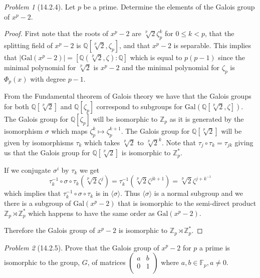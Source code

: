 \documentclass[10pt]{article}
\newcommand{\sk}{\vskip 10mm}
\newcommand{\bb}[1]{\mathbb{#1}}
\theoremstyle{remark}
\newtheorem{problem}{Problem}
\theoremstyle{remark}
\begin{document}
\sk

\begin{problem}[14.2.4]
  Let $p$ be a prime. Determine the elements of the Galois group of $x^p-2$.
\end{problem}

\begin{proof}
  First note that the roots of $x^p-2$ are $\sqrt[p]{2}\zeta_p^k$ for $0\leq k<p$,
  that the splitting field of $x^p-2$ is $\bb{Q}[\sqrt[p]{2},\zeta_p]$, and
  that $x^p-2$ is separable. This implies that
  $|\mathrm{Gal}(x^p-2)|=[\bb{Q}(\sqrt[p]{2},\zeta):\bb{Q}]$ which is equal to
  $p(p-1)$ since the minimal polynomial for $\sqrt[p]{2}$ is $x^p-2$ and
  the minimal polynomial for $\zeta_p$ is $\Phi_p(x)$ with degree $p-1$.

  From the Fundamental theorem of Galois theory we have that
  the Galois groups for both $\bb{Q}[\sqrt[p]{2}]$ and $\bb{Q}[\zeta_p]$ correspond
  to subgroups for $\mathrm{Gal}(\bb{Q}[\sqrt[p]{2},\zeta])$. The Galois group for
  $\bb{Q}[\zeta_p]$ will be isomorphic to $\bb{Z}_p$ as it is generated by the
  isomorphism $\sigma$ which maps $\zeta_p^k\mapsto \zeta_p^{k+1}$. The Galois group for $\bb{Q}[\sqrt[p]{2}]$
  will be given by isomorphisms $\tau_k$ which takes $\sqrt[p]{2}$ to $\sqrt[p]{2}^k$. Note
  that $\tau_j\circ\tau_k=\tau_{jk}$ giving us that the Galois group for $\bb{Q}[\sqrt[p]{2}]$ is
  isomorphic to $\bb{Z}_p^*$.

  If we conjugate $\sigma^i$ by $\tau_k$ we get
  \[\tau_k^{-1}\circ\sigma\circ\tau_{k}(\sqrt[p]{2}\zeta^j)= \tau_k^{-1}(\sqrt[p]{2}\zeta^{jk+1})=\sqrt[p]{2}\zeta^{j+k^{-1}}\]
  which implies that $\tau_k^{-1}\circ\sigma\circ\tau_{k}$ is in $\langle\sigma\rangle$. Thus $\langle\sigma\rangle$ is a normal subgroup and
  we there is a subgroup of $\mathrm{Gal}(x^p-2)$ that is isomorphic to the semi-direct product
  $\bb{Z}_p\rtimes\bb{Z}_p^*$ which happens to have the same order as $\mathrm{Gal}(x^p-2)$.

  Therefore the Galois group of $x^p-2$ is isomorphic to $\bb{Z}_p\rtimes\bb{Z}_p^*$.
\end{proof}

\sk

\begin{problem}[14.2.5]
  Prove that the Galois group of $x^p-2$ for $p$ a prime is isomorphic to
  the group, $G$, of matrices $\left(\begin{array}{cc}a&b\\0&1\\ \end{array}\right)$
  where $a,b\in\bb{F}_p,a\neq 0$.
\end{problem}
\end{document}
